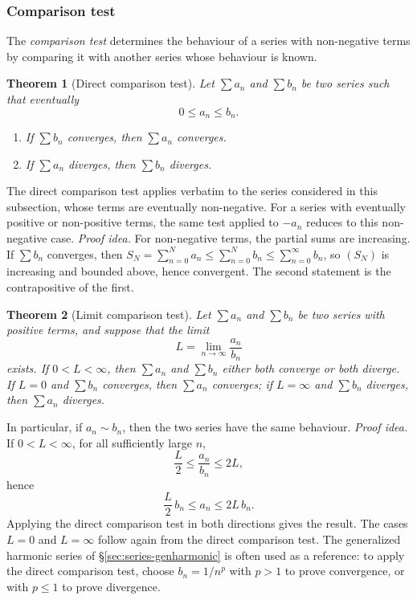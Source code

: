 \documentclass[11pt,a4paper]{article}
\theoremstyle{definition} \newtheorem{definition}{Definition} \theoremstyle{plain} \newtheorem{theorem}{Theorem}
\begin{document}
\subsubsection{Comparison test}
The \emph{comparison test} determines the behaviour of a series with non-negative terms by comparing it with another series whose behaviour is known.
\begin{theorem}[Direct comparison test]\label{thm:direct-comparison} Let $\sum a_n$ and $\sum b_n$ be two series such that eventually
\[ 0 \le a_n \le b_n. \]
\begin{enumerate} \item If $\sum b_n$ converges, then $\sum a_n$ converges. \item If $\sum a_n$ diverges, then $\sum b_n$ diverges. \end{enumerate} \end{theorem}
The direct comparison test applies verbatim to the series considered in this subsection, whose terms are eventually non-negative.
For a series with eventually positive or non-positive terms, the same test applied to $-a_n$ reduces to this non-negative case.
\emph{Proof idea.}
For non-negative terms, the partial sums are increasing.
If $\sum b_n$ converges, then $S_N = \sum_{n=0}^{N} a_n \le \sum_{n=0}^{N} b_n \le \sum_{n=0}^{\infty} b_n$, so $(S_N)$ is increasing and bounded above, hence convergent.
The second statement is the contrapositive of the first.
\begin{theorem}[Limit comparison test]\label{thm:limit-comparison} Let $\sum a_n$ and $\sum b_n$ be two series with positive terms, and suppose that the limit
\[ L = \lim_{n\to\infty} \frac{a_n}{b_n} \]
exists.
If $0<L<\infty$, then $\sum a_n$ and $\sum b_n$ either both converge or both diverge.
If $L=0$ and $\sum b_n$ converges, then $\sum a_n$ converges; if $L=\infty$ and $\sum b_n$ diverges, then $\sum a_n$ diverges. \end{theorem}
In particular, if $a_n \sim b_n$, then the two series have the same behaviour.
\emph{Proof idea.}
If $0<L<\infty$, for all sufficiently large $n$,
\[ \frac{L}{2} \le \frac{a_n}{b_n} \le 2L, \]
hence
\[ \frac{L}{2}\, b_n \le a_n \le 2L\, b_n. \]
Applying the direct comparison test in both directions gives the result.
The cases $L=0$ and $L=\infty$ follow again from the direct comparison test.
The generalized harmonic series of \S\ref{sec:series-genharmonic} is often used as a reference: to apply the direct comparison test, choose $b_n = 1/n^p$ with $p>1$ to prove convergence, or with $p\le 1$ to prove divergence.
\end{document}
